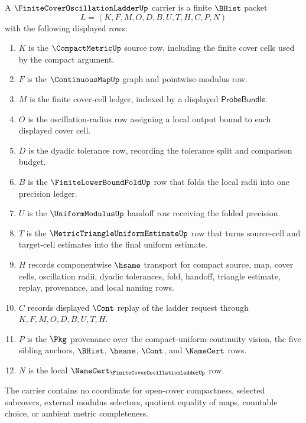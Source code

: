 \begin{definition}
\label{def:finite-cover-oscillation-ladder-carrier}
A $\FiniteCoverOscillationLadderUp$ carrier is a finite $\BHist$ packet
$$
L=(K,F,M,O,D,B,U,T,H,C,P,N)
$$
with the following displayed rows:
\begin{enumerate}
\item $K$ is the $\CompactMetricUp$ source row, including the finite cover cells used by the compact argument.
\item $F$ is the $\ContinuousMapUp$ graph and pointwise-modulus row.
\item $M$ is the finite cover-cell ledger, indexed by a displayed $\mathsf{ProbeBundle}$.
\item $O$ is the oscillation-radius row assigning a local output bound to each displayed cover cell.
\item $D$ is the dyadic tolerance row, recording the tolerance split and comparison budget.
\item $B$ is the $\FiniteLowerBoundFoldUp$ row that folds the local radii into one precision ledger.
\item $U$ is the $\UniformModulusUp$ handoff row receiving the folded precision.
\item $T$ is the $\MetricTriangleUniformEstimateUp$ row that turns source-cell and target-cell estimates into the final uniform estimate.
\item $H$ records componentwise $\hsame$ transport for compact source, map, cover cells, oscillation radii, dyadic tolerances, fold, handoff, triangle estimate, replay, provenance, and local naming rows.
\item $C$ records displayed $\Cont$ replay of the ladder request through $K,F,M,O,D,B,U,T,H$.
\item $P$ is the $\Pkg$ provenance over the compact-uniform-continuity vision, the five sibling anchors, $\BHist$, $\hsame$, $\Cont$, and $\NameCert$ rows.
\item $N$ is the local $\NameCert_{\FiniteCoverOscillationLadderUp}$ row.
\end{enumerate}
The carrier contains no coordinate for open-cover compactness, selected subcovers, external modulus selectors, quotient equality of maps, countable choice, or ambient metric completeness.
\end{definition}

